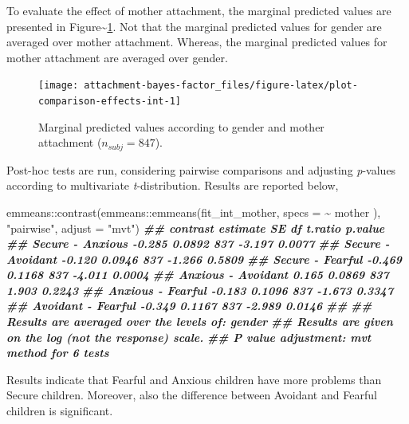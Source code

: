 \documentclass[
]{book}
\newenvironment{Shaded}{\begin{snugshade}}{\end{snugshade}}
\newcommand{\AttributeTok}[1]{\textcolor[rgb]{0.77,0.63,0.00}{#1}}
\newcommand{\DocumentationTok}[1]{\textcolor[rgb]{0.56,0.35,0.01}{\textbf{\textit{#1}}}}
\newcommand{\FunctionTok}[1]{\textcolor[rgb]{0.00,0.00,0.00}{#1}}
\newcommand{\NormalTok}[1]{#1}
\newcommand{\SpecialCharTok}[1]{\textcolor[rgb]{0.00,0.00,0.00}{#1}}
\newcommand{\StringTok}[1]{\textcolor[rgb]{0.31,0.60,0.02}{#1}}
\begin{document}
To evaluate the effect of mother attachment, the marginal predicted values are presented in Figure\textasciitilde\ref{fig:plot-comparison-effects-int}. Not that the marginal predicted values for gender are averaged over mother attachment. Whereas, the marginal predicted values for mother attachment are averaged over gender.

\begin{figure}

{\centering \texttt{[image: attachment-bayes-factor\_files/figure-latex/plot-comparison-effects-int-1]} 

}

\caption{Marginal predicted values according to gender and mother attachment ($n_{subj} = 847$).}\label{fig:plot-comparison-effects-int}
\end{figure}

Post-hoc tests are run, considering pairwise comparisons and adjusting \emph{p}-values according to multivariate \emph{t}-distribution. Results are reported below,

\begin{Shaded}
\begin{Highlighting}[]
\NormalTok{emmeans}\SpecialCharTok{::}\FunctionTok{contrast}\NormalTok{(emmeans}\SpecialCharTok{::}\FunctionTok{emmeans}\NormalTok{(fit\_int\_mother, }\AttributeTok{specs =} \SpecialCharTok{\textasciitilde{}}\NormalTok{ mother ),}
                  \StringTok{"pairwise"}\NormalTok{, }\AttributeTok{adjust =} \StringTok{"mvt"}\NormalTok{)}
\DocumentationTok{\#\#  contrast           estimate     SE  df t.ratio p.value}
\DocumentationTok{\#\#  Secure {-} Anxious     {-}0.285 0.0892 837  {-}3.197  0.0077}
\DocumentationTok{\#\#  Secure {-} Avoidant    {-}0.120 0.0946 837  {-}1.266  0.5809}
\DocumentationTok{\#\#  Secure {-} Fearful     {-}0.469 0.1168 837  {-}4.011  0.0004}
\DocumentationTok{\#\#  Anxious {-} Avoidant    0.165 0.0869 837   1.903  0.2243}
\DocumentationTok{\#\#  Anxious {-} Fearful    {-}0.183 0.1096 837  {-}1.673  0.3347}
\DocumentationTok{\#\#  Avoidant {-} Fearful   {-}0.349 0.1167 837  {-}2.989  0.0146}
\DocumentationTok{\#\# }
\DocumentationTok{\#\# Results are averaged over the levels of: gender }
\DocumentationTok{\#\# Results are given on the log (not the response) scale. }
\DocumentationTok{\#\# P value adjustment: mvt method for 6 tests}
\end{Highlighting}
\end{Shaded}

Results indicate that Fearful and Anxious children have more problems than Secure children. Moreover, also the difference between Avoidant and Fearful children is significant.
\end{document}
